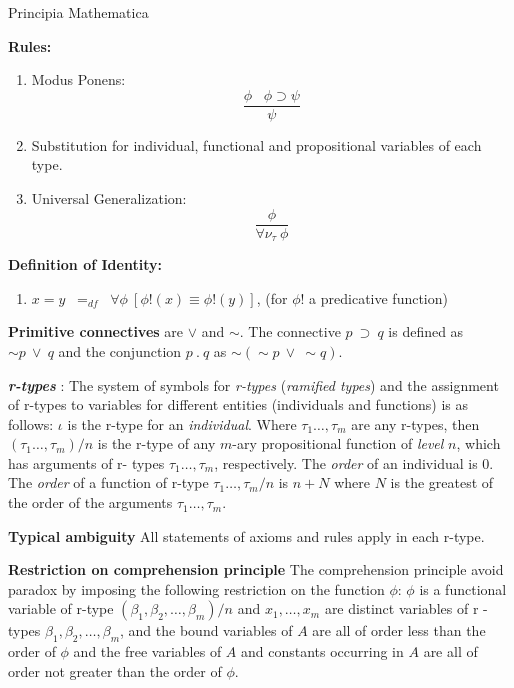 \begin{entry}{Principia Mathematica}
\begin{calculus}
\begin{enumerate}
\end{enumerate}


\textbf{Rules:}


\begin{enumerate}
\item Modus Ponens:  \[ \frac{\phi \; \; \; \phi \supset \psi}{\psi} \]

\item  Substitution for individual, functional and propositional variables of each type. 

\item  Universal Generalization: \[ \frac{\phi}{\forall \nu_{\tau} \: \phi}  \]
\end{enumerate}



\textbf{Definition of Identity:}
\begin{enumerate}
\item[] $ x = y \;\; =_{df} \;\; \forall \phi \: [\phi ! (x) \equiv \phi ! (y) ]$, (for $\phi !$ a  predicative function)
\end{enumerate}


\end{calculus}


\begin{clarifications}
{\bf Primitive connectives} are $ \vee $ and $\sim$. The connective $p \: \supset \: q$ is defined as $ \sim p \: \vee \: q$ and the conjunction $p\: . \: q$ as $\sim \! (\sim \! p \: \vee \: \sim \! q)$.

{\bf {\em r-types}} :
The system of symbols for {\em r-types} ({\em ramified types}) and the assignment of  r-types to variables for different entities (individuals and functions) is as follows:
$\iota$ is the r-type for an {\em individual}. Where $\tau_1 
\ldots, \tau_m$ are any r-types, then $(\tau_1 
\ldots, \tau_m) / n$ is  the r-type of any $m$-ary propositional function of {\em level} $n$, which has arguments of r- types $\tau_1 
\ldots, \tau_m$, respectively. 
 The {\em order} of an individual  is 0.
The {\em order} of a function of r-type $\tau_1 
\ldots, \tau_m / n$ is $n+N$ where $N$ is the greatest of the order of the arguments $\tau_1 
\ldots, \tau_m$.

{\bf Typical ambiguity} All statements of axioms and rules apply in each r-type.

{\bf Restriction on comprehension principle} The comprehension principle avoid paradox by imposing the following restriction on the function $\phi$: $\phi$ is a functional variable of r-type $(\beta_1, \beta_2, \ldots, \beta_m )/ n$ and $x_1, \ldots , x_m$ are distinct variables of r -types $\beta_1, \beta_2, \ldots, \beta_m$, and the bound variables of $A$ are all of order less than the order of $\phi$ and the free variables of $A$ and constants occurring in $A$ are all of order not greater than the order of $\phi$.



\end{clarifications}
\end{entry}
